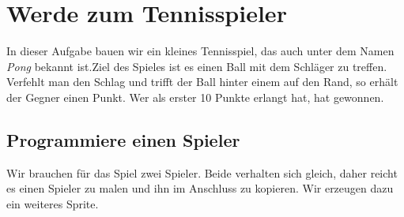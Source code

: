 \section{Werde zum Tennisspieler}
In dieser Aufgabe bauen wir ein kleines Tennisspiel, das auch unter dem Namen  \emph{Pong} bekannt ist.Ziel des Spieles ist es einen Ball mit dem Schläger zu treffen. Verfehlt man den Schlag und trifft der Ball hinter einem auf den Rand, so erhält der Gegner einen Punkt. Wer als erster 10 Punkte erlangt hat, hat gewonnen.
\subsection{Programmiere einen Spieler}
Wir brauchen für das Spiel zwei Spieler. Beide verhalten sich gleich, daher reicht es einen Spieler zu malen und ihn im Anschluss zu kopieren. Wir erzeugen dazu ein weiteres Sprite.

